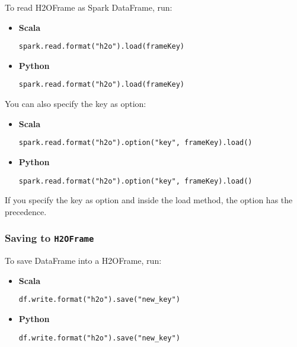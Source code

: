 \documentclass{standalone}
\begin{document}
    To read H2OFrame as Spark DataFrame, run:

    \begin{itemize}
        \item \textbf{Scala} \begin{lstlisting}[style=Scala]
spark.read.format("h2o").load(frameKey)
        \end{lstlisting}
        \item \textbf{Python} \begin{lstlisting}[style=Python]
spark.read.format("h2o").load(frameKey)
        \end{lstlisting}
    \end{itemize}

    You can also specify the key as option:

    \begin{itemize}
        \item \textbf{Scala} \begin{lstlisting}[style=Scala]
spark.read.format("h2o").option("key", frameKey).load()
        \end{lstlisting}
        \item \textbf{Python} \begin{lstlisting}[style=Python]
spark.read.format("h2o").option("key", frameKey).load()
        \end{lstlisting}
    \end{itemize}

    If you specify the key as option and inside the load method, the option
    has the precedence.

    \subsubsection{Saving to \texttt{H2OFrame}}

    To save DataFrame into a H2OFrame, run:

    \begin{itemize}
        \item \textbf{Scala} \begin{lstlisting}[style=Scala]
df.write.format("h2o").save("new_key")
        \end{lstlisting}
        \item \textbf{Python} \begin{lstlisting}[style=Python]
df.write.format("h2o").save("new_key")
        \end{lstlisting}
    \end{itemize}
\end{document}
